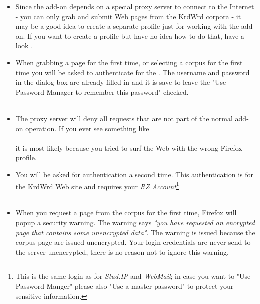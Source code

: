 \documentclass[12pt]{article}
\begin{document}
\begin{itemize}
\item Since the add-on depends on a special proxy server to connect to the Internet - you can only grab and submit Web pages from the KrdWrd corpora - it may be a good idea to create a separate profile just for working with the add-on. If you want to create a profile but have no idea how to do that, have a look . \\
\item When grabbing a page for the first time, or selecting a corpus for the first time you will be asked to authenticate for the . The username and password in the dialog box are already filled in and it is save to leave the "Use Password Manager to remember this password" checked. \\
 \\

\item The proxy server will deny all requests that are not part of the normal add-on operation. If you ever see something like \\
 \\
it is most likely because you tried to surf the Web with the wrong Firefox profile. \\

\item You will be asked for authentication a second time. This authentication is for the KrdWrd Web site and requires your \emph{RZ Account}\footnote{This is the same login as for \emph{Stud.IP} and \emph{WebMail}; in case you want to "Use Password Manger" please also "Use a master password" to protect your sensitive information.} \\
 \\ 

\item When you request a page from the corpus for the first time, Firefox will popup a security warning. The warning says \emph{"you have requested an encrypted page that contains some unencrypted data"}. The warning is issued because the corpus page are issued unencrypted. Your login credentials are never send to the server unencrypted, there is no reason not to ignore this warning. \\

\end{itemize}
\end{document}
